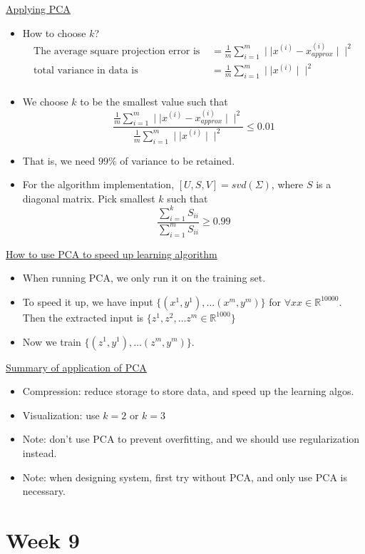\documentclass[12pt]{article}
\begin{document}
\underline{Applying PCA}
\begin{itemize}
	\item How to choose $k$?
	\begin{align*}
	\text{The average square projection error is }&=\frac{1}{m}\sum_{i=1}^{m}\mid\mid x^{(i)}-x_{approx}^{(i)}\mid\mid ^2\\
	\text{total variance in data is }&=\frac{1}{m}\sum_{i=1}^{m}\mid\mid x^{(i)} \mid\mid ^2\\
	\end{align*}
		\item We choose $k$ to be the smallest value such that
		\[\frac{ \frac{1}{m}\sum_{i=1}^{m}\mid\mid x^{(i)}-x_{approx}^{(i)}\mid\mid ^2}{\frac{1}{m}\sum_{i=1}^{m}\mid\mid x^{(i)} \mid\mid ^2} \leq 0.01\]
		\item That is, we need $99\%$ of variance to be retained.
		\item For the algorithm implementation, $[U,S,V] = svd(\Sigma)$, where $S$ is a diagonal matrix. Pick smallest $k$ such that
		\[ \frac{\sum_{i=1}^{k}S_{ii}}{\sum_{i=1}^{m}S_{ii}} \geq0.99\]
\end{itemize}

\underline{How to use PCA to speed up learning algorithm}

\begin{itemize}
	\item When running PCA, we only run it on the training set.
	\item To speed it up, we have input $\{(x^1,y^1),\ldots (x^m,y^m) \}$ for $\forall x x\in\mathbb{R}^{10000}$. Then the extracted input is $\{z^1,z^2,\ldots z^m\in \mathbb{R}^{1000}\}$\\
	\item Now we train $\{(z^1,y^1),\ldots (z^m,y^m) \}$.
	
\end{itemize}

\underline{Summary of application of PCA}

\begin{itemize}
	\item Compression: reduce storage to store data, and speed up the learning algos.
	\item Visualization: use $k=2$ or $k=3$
	\item Note: don't use PCA to prevent overfitting, and we should use regularization instead.
	\item Note: when designing system, first try without PCA, and only use PCA is necessary.
\end{itemize}

\newpage\section*{Week 9}
\end{document}
